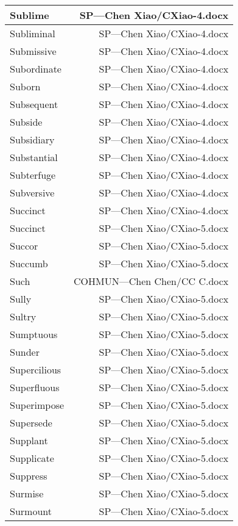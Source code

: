 \documentclass{article}
\begin{document}
\begin{center}
\begin{longtable}{|l|r|}
\hline
Sublime  &  SP---Chen Xiao/CXiao-4.docx\\  
\hline
Subliminal  &  SP---Chen Xiao/CXiao-4.docx\\  
\hline
Submissive  &  SP---Chen Xiao/CXiao-4.docx\\  
\hline
Subordinate  &  SP---Chen Xiao/CXiao-4.docx\\  
\hline
Suborn  &  SP---Chen Xiao/CXiao-4.docx\\  
\hline
Subsequent  &  SP---Chen Xiao/CXiao-4.docx\\  
\hline
Subside  &  SP---Chen Xiao/CXiao-4.docx\\  
\hline
Subsidiary  &  SP---Chen Xiao/CXiao-4.docx\\  
\hline
Substantial  &  SP---Chen Xiao/CXiao-4.docx\\  
\hline
Subterfuge  &  SP---Chen Xiao/CXiao-4.docx\\  
\hline
Subversive  &  SP---Chen Xiao/CXiao-4.docx\\  
\hline
Succinct  &  SP---Chen Xiao/CXiao-4.docx\\  
\hline
Succinct  &  SP---Chen Xiao/CXiao-5.docx\\  
\hline
Succor  &  SP---Chen Xiao/CXiao-5.docx\\  
\hline
Succumb  &  SP---Chen Xiao/CXiao-5.docx\\  
\hline
Such  &  COHMUN---Chen Chen/CC C.docx\\  
\hline
Sully  &  SP---Chen Xiao/CXiao-5.docx\\  
\hline
Sultry  &  SP---Chen Xiao/CXiao-5.docx\\  
\hline
Sumptuous  &  SP---Chen Xiao/CXiao-5.docx\\  
\hline
Sunder  &  SP---Chen Xiao/CXiao-5.docx\\  
\hline
Supercilious  &  SP---Chen Xiao/CXiao-5.docx\\  
\hline
Superfluous  &  SP---Chen Xiao/CXiao-5.docx\\  
\hline
Superimpose  &  SP---Chen Xiao/CXiao-5.docx\\  
\hline
Supersede  &  SP---Chen Xiao/CXiao-5.docx\\  
\hline
Supplant  &  SP---Chen Xiao/CXiao-5.docx\\  
\hline
Supplicate  &  SP---Chen Xiao/CXiao-5.docx\\  
\hline
Suppress  &  SP---Chen Xiao/CXiao-5.docx\\  
\hline
Surmise  &  SP---Chen Xiao/CXiao-5.docx\\  
\hline
Surmount  &  SP---Chen Xiao/CXiao-5.docx\\  

\end{longtable}
\end{center}
\end{document}
